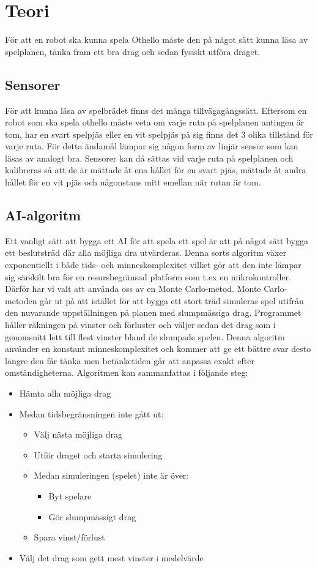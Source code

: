 \documentclass[a4paper]{article}
\begin{document}
\section{Teori}
För att en robot ska kunna spela Othello måste den på något sätt kunna läsa av spelplanen, tänka fram ett bra drag och sedan fysiskt utföra draget.

\subsection{Sensorer}
För att kunna läsa av spelbrädet finns det många tillvägagångssätt.
Eftersom en robot som ska spela othello måste veta om varje ruta på spelplanen antingen är tom, har en svart spelpjäs eller en vit spelpjäs på sig finns det 3 olika tillstånd för varje ruta.
För detta ändamål lämpar sig någon form av linjär sensor som kan läsas av analogt bra.
Sensorer kan då sättas vid varje ruta på spelplanen och kalibreras så att de är mättade åt ena hållet för en svart pjäs,  mättade åt andra hållet för en vit pjäs och någonstans mitt emellan när rutan är tom.

\subsection{AI-algoritm} \label{AI}
Ett vanligt sätt att bygga ett AI för att spela ett spel är att på något sätt bygga ett beslutsträd där alla möjliga dra utvärderas.
Denna sorts algoritm växer exponentiellt i både tids- och minneskomplexitet vilket gör att den inte lämpar sig särskilt bra för en resursbegränsad platform som t.ex en mikrokontroller.
Därför har vi valt att använda oss av en Monte Carlo-metod.
Monte Carlo-metoden går ut på att istället för att bygga ett stort träd simuleras spel utifrån den nuvarande uppställningen på planen med slumpmässiga drag.
Programmet håller räkningen på vinster och förluster och väljer sedan det drag som i genomsnitt lett till flest vinster bland de slumpade spelen.
Denna algoritm använder en konstant minneskomplexitet och kommer att ge ett bättre svar desto längre den får tänka men betänketiden går att anpassa exakt efter omständigheterna.
Algoritmen kan sammanfattas i följande steg:
\begin{itemize}
\item Hämta alla möjliga drag
\item Medan tidsbegränsningen inte gått ut: 
	\begin{itemize} 
	\item Välj nästa möjliga drag
	\item Utför draget och starta simulering
	\item Medan simuleringen (spelet) inte är över:
		\begin{itemize}
		\item Byt spelare
		\item Gör slumpmässigt drag
		\end{itemize}	
	\item Spara vinst/förlust
	\end{itemize}
\item Välj det drag som gett mest vinster i medelvärde
\end{itemize}
\end{document}
